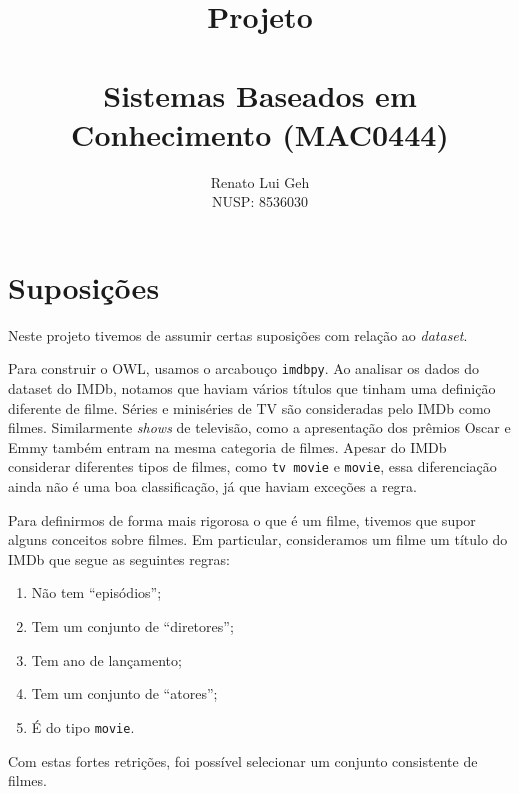 \documentclass{article}
\title{\Huge Projeto\\~\\\LARGE Sistemas Baseados em Conhecimento (MAC0444)}
\date{}
\author{\Large{Renato Lui Geh}\\\large{NUSP\@: 8536030}\\}
\newcommand{\code}[1]{\lstinline[mathescape=true]{#1}}
\begin{document}
\maketitle
\newpage

\section{Suposições}

Neste projeto tivemos de assumir certas suposições com relação ao \textit{dataset}.

Para construir o OWL, usamos o arcabouço \code{imdbpy}. Ao analisar os dados do dataset do IMDb,
notamos que haviam vários títulos que tinham uma definição diferente de filme. Séries e miniséries
de TV são consideradas pelo IMDb como filmes. Similarmente \textit{shows} de televisão, como a
apresentação dos prêmios Oscar e Emmy também entram na mesma categoria de filmes. Apesar do IMDb
considerar diferentes tipos de filmes, como \code{tv movie} e \code{movie}, essa diferenciação
ainda não é uma boa classificação, já que haviam exceções a regra.

Para definirmos de forma mais rigorosa o que é um filme, tivemos que supor alguns conceitos sobre
filmes. Em particular, consideramos um filme um título do IMDb que segue as seguintes regras:

\begin{enumerate}
  \item Não tem ``episódios'';
  \item Tem um conjunto de ``diretores'';
  \item Tem ano de lançamento;
  \item Tem um conjunto de ``atores'';
  \item É do tipo \code{movie}.
\end{enumerate}

Com estas fortes retrições, foi possível selecionar um conjunto consistente de filmes.

\end{document}
